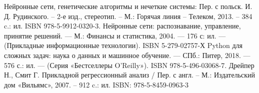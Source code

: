 \newpage

\begin{thebibliography}{99}
   Нейронные сети, генетические алгоритмы и нечеткие системы: Пер. с польск.  И. Д. Рудинского. – 2-е изд., стереотип. –  М.: Горячая линия – Телеком, 2013. – 384 c.: ил. ISBN 978-5-9912-0320-3.
   Нейронные сети: распознавание, управление, принятие решений. — М.: Финансы и статистика, 2004. — 176 с: ил. — (Прикладные информационные технологии). ISBN 5-279-02757-Х 
   Python для сложных задач: наука о данных и машинное обучение. — СПб.: Питер, 2018. — 576 с.: ил. — (Серия «Бестселлеры O’Reilly»). ISBN 978-5-496-03068-7.
  	Дрейпер Н., Смит Г. Прикладной регрессионный анализ / Пер. с англ. – М.: Издательский дом «Вильямс», 2007. – 912 c.: ил. ISBN: 978-5-8459-0963-3 
\end{thebibliography}